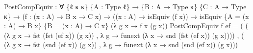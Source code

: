 \documentclass[
  11pt,
  oneside,
  article]{memoir}
\newenvironment{Shaded}{}{}
\newcommand{\NormalTok}[1]{#1}
\newcommand{\OtherTok}[1]{\textcolor[rgb]{0.00,0.44,0.13}{#1}}
\theoremstyle{definition}
\theoremstyle{plain}
\newcommand{\0}{\textsf{0}}
\newcommand{\1}{\tn{\textsf{1}}}
\begin{document}
\begin{Shaded}
\begin{Highlighting}[]
\NormalTok{PostCompEquiv }\OtherTok{:} \OtherTok{∀} \OtherTok{\{}\NormalTok{ℓ κ κ\textquotesingle{}}\OtherTok{\}} \OtherTok{\{}\NormalTok{A }\OtherTok{:}\NormalTok{ Type ℓ}\OtherTok{\}} 
                \OtherTok{→} \OtherTok{\{}\NormalTok{B }\OtherTok{:}\NormalTok{ A }\OtherTok{→}\NormalTok{ Type κ}\OtherTok{\}} \OtherTok{\{}\NormalTok{C }\OtherTok{:}\NormalTok{ A }\OtherTok{→}\NormalTok{ Type κ\textquotesingle{}}\OtherTok{\}}
                \OtherTok{→} \OtherTok{(}\NormalTok{f }\OtherTok{:} \OtherTok{(}\NormalTok{x }\OtherTok{:}\NormalTok{ A}\OtherTok{)} \OtherTok{→}\NormalTok{ B x }\OtherTok{→}\NormalTok{ C x}\OtherTok{)} \OtherTok{→} \OtherTok{((}\NormalTok{x }\OtherTok{:}\NormalTok{ A}\OtherTok{)} \OtherTok{→}\NormalTok{ isEquiv }\OtherTok{(}\NormalTok{f x}\OtherTok{))}
                \OtherTok{→}\NormalTok{ isEquiv }\OtherTok{\{}\NormalTok{A }\OtherTok{=} \OtherTok{(}\NormalTok{x }\OtherTok{:}\NormalTok{ A}\OtherTok{)} \OtherTok{→}\NormalTok{ B x}\OtherTok{\}} 
                          \OtherTok{\{}\NormalTok{B }\OtherTok{=} \OtherTok{(}\NormalTok{x }\OtherTok{:}\NormalTok{ A}\OtherTok{)} \OtherTok{→}\NormalTok{ C x}\OtherTok{\}}
                          \OtherTok{(λ}\NormalTok{ g x }\OtherTok{→}\NormalTok{ f x }\OtherTok{(}\NormalTok{g x}\OtherTok{))}
\NormalTok{PostCompEquiv f ef }\OtherTok{=} 
    \OtherTok{(} \OtherTok{(} \OtherTok{(λ}\NormalTok{ g x }\OtherTok{→}\NormalTok{ fst }\OtherTok{(}\NormalTok{fst }\OtherTok{(}\NormalTok{ef x}\OtherTok{))} \OtherTok{(}\NormalTok{g x}\OtherTok{))}
\NormalTok{      , }\OtherTok{λ}\NormalTok{ g }\OtherTok{→}\NormalTok{ funext }\OtherTok{(λ}\NormalTok{ x }\OtherTok{→}\NormalTok{ snd }\OtherTok{(}\NormalTok{fst }\OtherTok{(}\NormalTok{ef x}\OtherTok{))} \OtherTok{(}\NormalTok{g x}\OtherTok{))))}
\NormalTok{    , }\OtherTok{(} \OtherTok{(λ}\NormalTok{ g x }\OtherTok{→}\NormalTok{ fst }\OtherTok{(}\NormalTok{snd }\OtherTok{(}\NormalTok{ef x}\OtherTok{))} \OtherTok{(}\NormalTok{g x}\OtherTok{))} 
\NormalTok{      , }\OtherTok{λ}\NormalTok{ g }\OtherTok{→}\NormalTok{ funext }\OtherTok{(λ}\NormalTok{ x }\OtherTok{→}\NormalTok{ snd }\OtherTok{(}\NormalTok{snd }\OtherTok{(}\NormalTok{ef x}\OtherTok{))} \OtherTok{(}\NormalTok{g x}\OtherTok{)))}
\end{Highlighting}
\end{Shaded}


\makeatletter
{}
\makeatother
\end{document}
